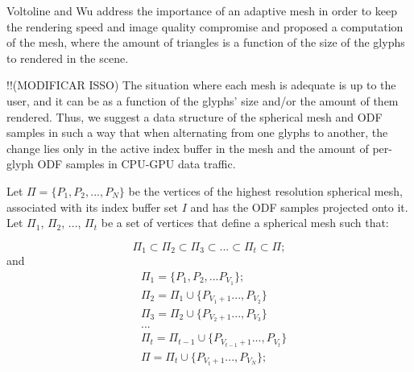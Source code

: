 \documentclass[twoside,twocolumn,10pt]{article}
\begin{document}
Voltoline and Wu \cite{voltoline2021} address the importance of an adaptive mesh in order to keep the rendering speed and image quality compromise and proposed a computation of the mesh, where the amount of triangles is a function of the size of the glyphs to rendered in the scene.




!!(MODIFICAR ISSO) The situation where each mesh is adequate is up to the user, and it can be as a function of the glyphs' size \cite{voltoline2021} and/or the amount of them rendered. Thus, we suggest a data structure of the spherical mesh and ODF samples in such a way that when alternating from one glyphs to another, the change lies only in the active index buffer in the mesh and the amount of per-glyph ODF samples in CPU-GPU data traffic.

Let $\Pi = \{P_1, P_2, ..., P_{N}\}$ be the vertices of the highest resolution spherical mesh, associated with its index buffer set $I$ and has the ODF samples projected onto it. Let $\Pi_{1}$, $\Pi_{2}$, ..., $\Pi_{t}$ be a set of vertices that define a spherical mesh such that:

\begin{equation}
\label{eq::subset_condition1}
    \Pi_{1} \subset \Pi_{2} \subset \Pi_{3} \subset ... \subset \Pi_{t} \subset \Pi;
\end{equation}
and
\begin{align}
 \label{eq::subset_condition2}
    &\Pi_{1} = \{P_1, P_2,... P_{V_1}\}; \nonumber\\
    &\Pi_{2} = \Pi_1 \cup \{ P_{V_1+1}..., P_{V_2}\} \nonumber\\
    &\Pi_{3} = \Pi_2 \cup \{ P_{V_2+1}..., P_{V_3}\} \nonumber\\
    &... \\
    &\Pi_{t} = \Pi_{t-1} \cup \{ P_{V_{t-1}+1}..., P_{V_t}\} \nonumber\\
    &\Pi = \Pi_{t} \cup \{ P_{V_t+1}..., P_{V_N}\}; \nonumber
\end{align}
\end{document}
